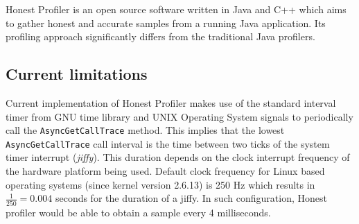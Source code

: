 \documentclass[..thesis.tex]{subfiles}
\begin{document}
Honest Profiler \cite{hon_prof} is an open source software written in Java and C++ which aims to gather honest and accurate samples from a running Java application. 
Its profiling approach significantly differs from the traditional Java profilers.

\subsection{Current limitations}
Current implementation of Honest Profiler makes use of the standard interval timer from GNU time library and UNIX Operating System signals to periodically call the \texttt{AsyncGetCallTrace} method. This implies that the lowest \texttt{AsyncGetCallTrace} call interval is the time between two ticks of the system timer interrupt (\textit{jiffy}). This duration depends on the clock interrupt frequency of the hardware platform being used. Default clock frequency for Linux based operating systems (since kernel version 2.6.13) is 250 Hz which results in $\frac{1}{250} = 0.004$ seconds for the duration of a jiffy. In such configuration, Honest profiler would be able to obtain a sample every 4 milliseconds.




\end{document}
